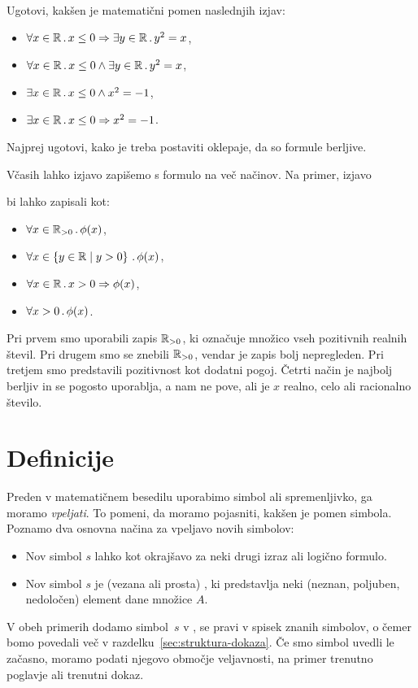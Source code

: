 \begin{vaja}
  Ugotovi, kakšen je matematični pomen naslednjih izjav:
  \begin{itemize}
  \item $\forall x \in \mathbb{R} \,.\, x \leq 0 \Rightarrow \exists y \in \mathbb{R} \,.\, y^2 = x$,
  \item $\forall x \in \mathbb{R} \,.\, x \leq 0 \land \exists y \in \mathbb{R} \,.\, y^2 = x$,
  \item $\exists x \in \mathbb{R} \,.\, x \leq 0 \land x^2 = -1$,
  \item $\exists x \in \mathbb{R} \,.\, x \leq 0 \Rightarrow x^2 = -1$.
  \end{itemize}
  Najprej ugotovi, kako je treba postaviti oklepaje, da so formule berljive.
\end{vaja}


Včasih lahko izjavo zapišemo s formulo na več načinov. Na primer, izjavo
%
\begin{quote}
\end{quote}
%
bi lahko zapisali kot:
%
\begin{itemize}
\item $\forall x \in \mathbb{R}_{> 0} \,.\, \phi(x)$,
\item $\forall x \in \left\{y \in \mathbb{R} \; \middle| \; y > 0\right\} \,.\, \phi(x)$,
\item $\forall x \in \mathbb{R} \,.\, x > 0 \Rightarrow \phi(x)$,
\item $\forall x > 0 \,.\, \phi(x)$.
\end{itemize}
%
Pri prvem smo uporabili zapis $\mathbb{R}_{> 0}$, ki označuje množico vseh pozitivnih realnih števil.
Pri drugem smo se znebili $\mathbb{R}_{> 0}$, vendar je zapis bolj nepregleden.
Pri tretjem smo predstavili pozitivnost kot dodatni pogoj.
Četrti način je najbolj berljiv in se pogosto uporablja, a nam ne pove, ali je $x$ realno, celo ali racionalno število.

\section{Definicije}
\label{sec:definicije}

Preden v matematičnem besedilu uporabimo simbol ali spremenljivko, ga moramo \emph{vpeljati}. To pomeni, da moramo pojasniti, kakšen je pomen simbola. Poznamo dva osnovna načina za vpeljavo novih simbolov:
%
\begin{itemize}
\item Nov simbol $s$ lahko  kot okrajšavo za neki drugi izraz ali logično formulo.
\item Nov simbol $s$ je (vezana ali prosta) , ki predstavlja neki (neznan, poljuben, nedoločen) element dane množice $A$.
\end{itemize}
%
V obeh primerih dodamo simbol~$s$ v , se pravi v spisek znanih simbolov, o čemer bomo povedali več v razdelku~\ref{sec:struktura-dokaza}. Če smo simbol uvedli le začasno, moramo podati njegovo območje veljavnosti, na primer trenutno poglavje ali trenutni dokaz.

